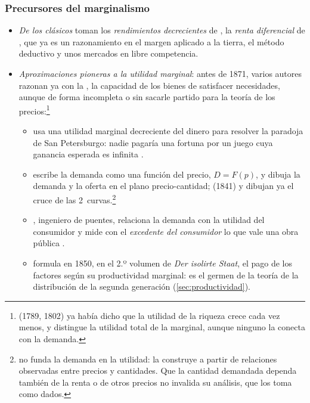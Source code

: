 \documentclass[11pt]{article}
\begin{document}
\subsubsection{Precursores del marginalismo}\label{sec:precursores}

\begin{itemize}
\item \emph{De los clásicos} toman los \emph{rendimientos decrecientes} de , la \emph{renta diferencial} de \textcite{Ricardo1817Principles}, que ya es un razonamiento en el margen aplicado a la tierra, el método deductivo y unos mercados en libre competencia.
\item \emph{Aproximaciones pioneras a la utilidad marginal}: antes de 1871, varios autores razonan ya con la , la capacidad de los bienes de satisfacer necesidades, aunque de forma incompleta o sin sacarle partido para la teoría de los precios:\footnote{ (1789, 1802) ya había dicho que la utilidad de la riqueza crece cada vez menos, y \textcite{Lloyd1833Lecture} distingue la utilidad total de la marginal, aunque ninguno la conecta con la demanda\nocite{Fonseca2026Phases}.}
  \begin{itemize}
  \item {} \parencite*{Bernoulli1738Specimen} usa una utilidad marginal decreciente del dinero para resolver la paradoja de San Petersburgo: nadie pagaría una fortuna por un juego cuya ganancia esperada es infinita .
  \item {} \parencite*{Cournot1838Recherches} escribe la demanda como una función del precio, $D=F(p)$, y dibuja la demanda y la oferta en el plano precio-cantidad;  (1841) y  \parencite*{Jenkin1870Graphic} dibujan ya el cruce de las 2~curvas\nocite{Humphrey1992Marshallian}.\footnote{ no funda la demanda en la utilidad: la construye a partir de relaciones observadas entre precios y cantidades. Que la cantidad demandada dependa también de la renta o de otros precios no invalida su análisis, que los toma como dados.}
  \item {} \parencite*{Dupuit1844Mesure}, ingeniero de puentes, relaciona la demanda con la utilidad del consumidor y mide con el \emph{excedente del consumidor} lo que vale una obra pública .
  \item {} formula en 1850, en el 2.º volumen de \emph{Der isolirte Staat}, el pago de los factores según su productividad marginal\nocite{Thunen1826Staat}: es el germen de la teoría de la distribución de la segunda generación (\ref{sec:productividad}).

\end{itemize}
\end{itemize}
\end{document}
